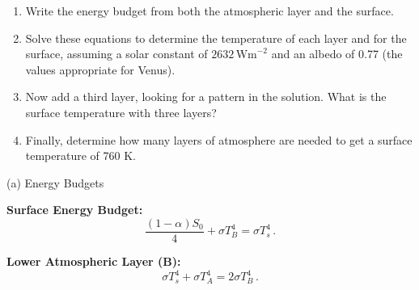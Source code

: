\documentclass[letterpaper, 11pt]{article}
\newcommand{\1}{\mathds{1}}	%
\theoremstyle{definition}
\begin{document}
\begin{enumerate}
\item[(a)] Write the energy budget from both the atmospheric layer and the surface.

\item[(b)] Solve these equations to determine the temperature of each layer and for the surface, assuming a solar constant of $2632\,\text{Wm}^{-2}$ and an albedo of 0.77 (the values appropriate for Venus).

\item[(c)] Now add a third layer, looking for a pattern in the solution. What is the surface temperature with three layers?

\item[(d)] Finally, determine how many layers of atmosphere are needed to get a surface temperature of 760 K.
\end{enumerate}

(a) Energy Budgets

\textbf{Surface Energy Budget:} 
\begin{equation*}
\frac{(1-\alpha)S_0}{4} + \sigma T_B^4 = \sigma T_s^4\,.
\end{equation*}

\textbf{Lower Atmospheric Layer (B):} 
\begin{equation*}
\sigma T_s^4 + \sigma T_A^4 = 2\sigma T_B^4\,.
\end{equation*}
\end{document}
